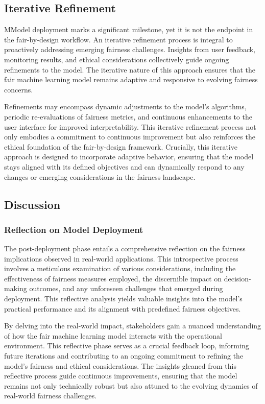 \documentclass[12pt,a4paper,openright,twoside]{book}
\begin{document}
\subsection{Iterative Refinement}

MModel deployment marks a significant milestone, yet it is not the endpoint in the fair-by-design workflow. An iterative refinement process is integral to proactively addressing emerging fairness challenges. Insights from user feedback, monitoring results, and ethical considerations collectively guide ongoing refinements to the model. The iterative nature of this approach ensures that the fair machine learning model remains adaptive and responsive to evolving fairness concerns.

Refinements may encompass dynamic adjustments to the model's algorithms, periodic re-evaluations of fairness metrics, and continuous enhancements to the user interface for improved interpretability. This iterative refinement process not only embodies a commitment to continuous improvement but also reinforces the ethical foundation of the fair-by-design framework. Crucially, this iterative approach is designed to incorporate adaptive behavior, ensuring that the model stays aligned with its defined objectives and can dynamically respond to any changes or emerging considerations in the fairness landscape.

\subsection{Discussion}

\subsubsection{Reflection on Model Deployment}

The post-deployment phase entails a comprehensive reflection on the fairness implications observed in real-world applications. This introspective process involves a meticulous examination of various considerations, including the effectiveness of fairness measures employed, the discernible impact on decision-making outcomes, and any unforeseen challenges that emerged during deployment. This reflective analysis yields valuable insights into the model's practical performance and its alignment with predefined fairness objectives.

By delving into the real-world impact, stakeholders gain a nuanced understanding of how the fair machine learning model interacts with the operational environment. This reflective phase serves as a crucial feedback loop, informing future iterations and contributing to an ongoing commitment to refining the model's fairness and ethical considerations. The insights gleaned from this reflective process guide continuous improvements, ensuring that the model remains not only technically robust but also attuned to the evolving dynamics of real-world fairness challenges.
\end{document}
